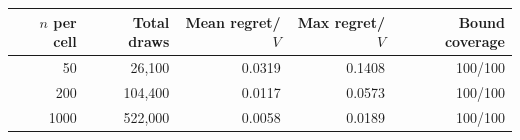 \begin{tabular}{@{}rrrrr@{}}
\toprule
$n$ per cell & Total draws & Mean regret/$V$ & Max regret/$V$ & Bound coverage \\
\midrule
50 & 26,100 & 0.0319 & 0.1408 & 100/100 \\
200 & 104,400 & 0.0117 & 0.0573 & 100/100 \\
1000 & 522,000 & 0.0058 & 0.0189 & 100/100 \\
\bottomrule
\end{tabular}
